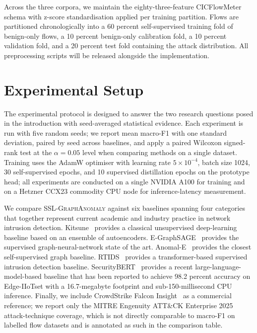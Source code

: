 \documentclass[journal,twoside]{IEEEtran}
\begin{document}
Across the three corpora, we maintain the eighty-three-feature CICFlowMeter
schema with z-score standardisation applied per training partition. Flows
are partitioned chronologically into a 60 percent self-supervised training
fold of benign-only flows, a 10 percent benign-only calibration fold, a
10 percent validation fold, and a 20 percent test fold containing the
attack distribution. All preprocessing scripts will be released alongside
the implementation.

\section{Experimental Setup}
\label{sec:experiments}
The experimental protocol is designed to answer the two research questions
posed in the introduction with seed-averaged statistical evidence. Each
experiment is run with five random seeds; we report mean macro-F1 with one
standard deviation, paired by seed across baselines, and apply a paired
Wilcoxon signed-rank test at the $\alpha = 0.05$ level when comparing
methods on a single dataset. Training uses the AdamW optimiser with
learning rate $5 \times 10^{-4}$, batch size 1024, 30 self-supervised
epochs, and 10 supervised distillation epochs on the prototype head; all
experiments are conducted on a single NVIDIA A100 for training and on a
Hetzner CCX23 commodity CPU node for inference-latency measurement.

We compare \textsc{SSL-GraphAnomaly} against six baselines spanning four
categories that together represent current academic and industry practice
in network intrusion detection. Kitsune~\cite{mirsky2018kitsune} provides
a classical unsupervised deep-learning baseline based on an ensemble of
autoencoders. E-GraphSAGE~\cite{lo2022egraphsage} provides the supervised
graph-neural-network state of the art. Anomal-E~\cite{caville2022anomale}
provides the closest self-supervised graph baseline. RTIDS~\cite{wu2022rtids}
provides a transformer-based supervised intrusion detection baseline.
SecurityBERT~\cite{ferrag2024securitybert} provides a recent
large-language-model-based baseline that has been reported to achieve
98.2 percent accuracy on Edge-IIoTset with a 16.7-megabyte footprint and
sub-150-millisecond CPU inference. Finally, we include
CrowdStrike Falcon Insight~\cite{crowdstrike2025mitre} as a commercial
reference; we report only the MITRE Engenuity ATT\&CK Enterprise 2025
attack-technique coverage, which is not directly comparable to macro-F1 on
labelled flow datasets and is annotated as such in the comparison table.
\end{document}
